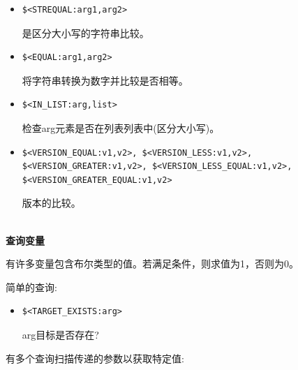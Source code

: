 \begin{itemize}
\item 
\begin{lstlisting}[style=styleCMake]
$<STREQUAL:arg1,arg2> 
\end{lstlisting}

是区分大小写的字符串比较。

\item 
\begin{lstlisting}[style=styleCMake]
$<EQUAL:arg1,arg2> 
\end{lstlisting}

将字符串转换为数字并比较是否相等。

\item 
\begin{lstlisting}[style=styleCMake]
$<IN_LIST:arg,list> 
\end{lstlisting}

检查arg元素是否在列表列表中(区分大小写)。

\item 
\begin{lstlisting}[style=styleCMake]
$<VERSION_EQUAL:v1,v2>, $<VERSION_LESS:v1,v2>,
$<VERSION_GREATER:v1,v2>, $<VERSION_LESS_EQUAL:v1,v2>,
$<VERSION_GREATER_EQUAL:v1,v2> 
\end{lstlisting}
版本的比较。
\end{itemize}

\hspace*{\fill} \\ %
\noindent
\textbf{查询变量}

有许多变量包含布尔类型的值。若满足条件，则求值为1，否则为0。

简单的查询:

\begin{itemize}
\item 
\begin{lstlisting}[style=styleCMake]
$<TARGET_EXISTS:arg> 
\end{lstlisting}
arg目标是否存在?
\end{itemize}

有多个查询扫描传递的参数以获取特定值:

